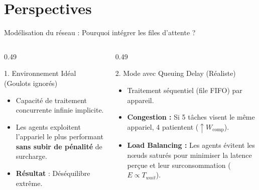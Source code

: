 \documentclass[10pt,aspectratio=169]{beamer}
\begin{document}
\section{Perspectives}
\begin{frame}{Modélisation du réseau : Pourquoi intégrer les files d'attente ?}

\begin{columns}[T]
\begin{column}{0.49\textwidth}
\begin{block}{1. Environnement Idéal (Goulots ignorés)}
\begin{itemize}
    \item Capacité de traitement concurrente infinie implicite.
    \item Les agents exploitent l'appariel le plus performant \textbf{sans subir de pénalité} de surcharge.
    \item \textbf{Résultat} : Déséquilibre extrême.
\end{itemize}
\end{block}
\end{column}

\begin{column}{0.49\textwidth}
\begin{block}{2. Mode avec Queuing Delay (Réaliste)}
\begin{itemize}
    \item Traitement séquentiel (file FIFO) par appareil.
    \item \textbf{Congestion :} Si 5 tâches visent le même appariel, 4 patientent ($\uparrow W_{\text{comp}}$).
    \item \textbf{Load Balancing :} Les agents évitent les nœuds saturés pour minimiser la latence perçue et leur surconsommation ($E \propto T_{wait}$).
\end{itemize}
\end{block}
\end{column}
\end{columns}

\end{frame}
\end{document}
